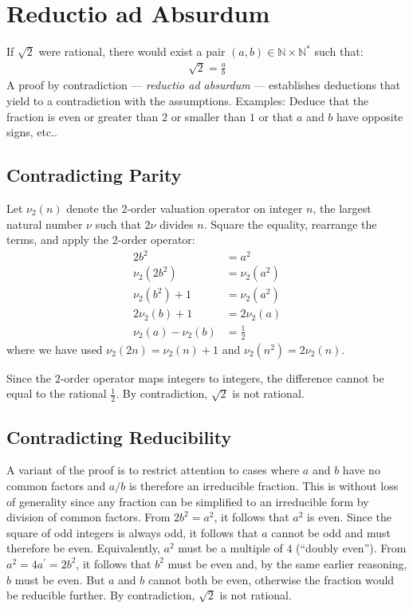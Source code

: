 \section*{Reductio ad Absurdum}
If $\sqrt{2}$ were rational, there would exist a pair $(a, b) \in \mathbb{N} \times \mathbb{N}^{*}$ such that:
\begin{align*}
\sqrt{2} = \frac{a}{b}
\end{align*}
A proof by contradiction --- \textit{reductio ad absurdum} --- establishes deductions that yield to a contradiction with the assumptions. Examples: Deduce that the fraction is even or greater than $2$ or smaller than $1$ or that $a$ and $b$ have opposite signs, etc..

\subsection*{Contradicting Parity} 
Let $\nu_{2}(n)$ denote the $2$-order valuation operator on integer $n$, the largest natural number $\nu$ such that $2\nu$ divides $n$. Square the equality, rearrange the terms, and apply the $2$-order operator:
\begin{align*}
2b^2 & = a^2 \\
\nu_{2}(2b^2) & = \nu_{2}(a^2) \\
\nu_{2}(b^2) + 1  & = \nu_{2}(a^2) \\
2\nu_{2}(b) + 1 & = 2\nu_{2}(a) \\
\nu_{2}(a) - \nu_{2}(b) & =  \frac{1}{2} 
\end{align*}
where we have used $\nu_{2}(2n)=\nu_{2}(n)+1$ and $\nu_{2}(n^2)=2\nu_{2}(n)$.

Since the $2$-order operator maps integers to integers, the difference cannot be equal to the rational $\frac{1}{2}$. By contradiction, $\sqrt{2}$ is not rational. 

\subsection*{Contradicting Reducibility}
A variant of the proof is to restrict attention to cases where $a$ and $b$ have no common factors and $a/b$ is therefore an irreducible fraction. This is without loss of generality since any fraction can be simplified to an irreducible form by division of common factors. From $2b^2 = a^2$, it follows that $a^2$ is even. Since the square of odd integers is always odd, it follows that $a$ cannot be odd and must therefore be even. Equivalently, $a^2$ must be a multiple of $4$ (``doubly even''). From $a^2 = 4 a^{\prime} = 2b^2$, it follows that $b^2$ must be even and, by the same earlier reasoning, $b$ must be even. But $a$ and $b$ cannot both be even, otherwise the fraction would be reducible further. By contradiction, $\sqrt{2}$ is not rational. 

